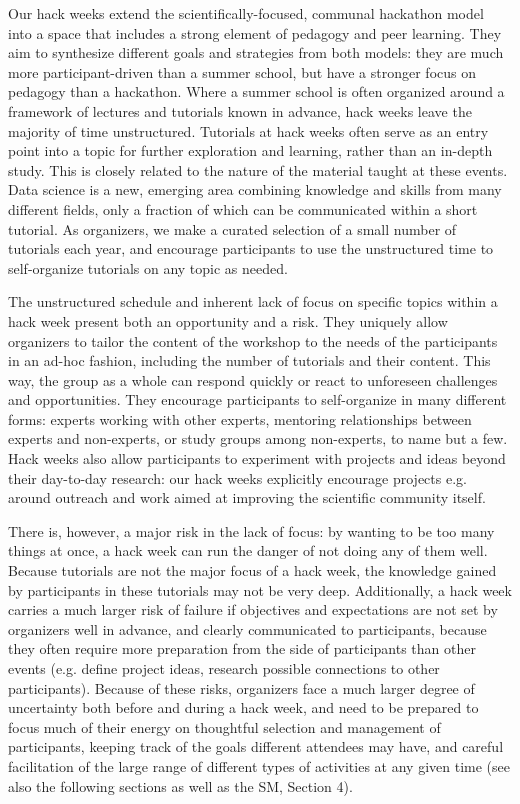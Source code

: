 Our hack weeks extend the scientifically-focused, communal hackathon model into a space that includes a strong element of pedagogy and peer learning. They aim to synthesize different goals and strategies from both models: they are much more participant-driven than a summer school, but have a stronger focus on pedagogy than a hackathon. Where a summer school is often organized around a framework of lectures and tutorials known in advance, hack weeks leave the majority of time unstructured. Tutorials at hack weeks often serve as an entry point into a topic for further exploration and learning, rather than an in-depth study. This is closely related to the nature of the material taught at these events. Data science is a new, emerging area combining knowledge and skills from many different fields, only a fraction of which can be communicated within a short tutorial. As organizers, we make a curated selection of a small number of tutorials each year, and encourage participants to use the unstructured time to self-organize tutorials on any topic as needed.%

The unstructured schedule and inherent lack of focus on specific topics within a hack week present both an opportunity and a risk. They uniquely allow organizers to tailor the content of the workshop to the needs of the participants in an ad-hoc fashion, including the number of tutorials and their content. This way, the group as a whole can respond quickly or react to unforeseen challenges and opportunities. They encourage participants to self-organize in many different forms: experts working with other experts, mentoring relationships between experts and non-experts, or study groups among non-experts, to name but a few. Hack weeks also allow participants to experiment with projects and ideas beyond their day-to-day research: our hack weeks explicitly encourage projects e.g.~ around outreach and work aimed at improving the scientific community itself. 

There is, however, a major risk in the lack of focus: by wanting to be too many things at once, a hack week can run the danger of not doing any of them well. Because tutorials are not the major focus of a hack week, the knowledge gained by participants in these tutorials may not be very deep. Additionally, a hack week carries a much larger risk of failure if objectives and expectations are not set by organizers well in advance, and clearly communicated to participants, because they often require more preparation from the side of participants than other events (e.g. define project ideas, research possible connections to other participants). 
Because of these risks, organizers face a much larger degree of uncertainty both before and during a hack week, and need to be prepared to focus much of their energy on thoughtful selection and management of participants, keeping track of the goals different attendees may have, and careful facilitation of the large range of different types of activities at any given time (see also the following sections as well as the SM, Section 4).

